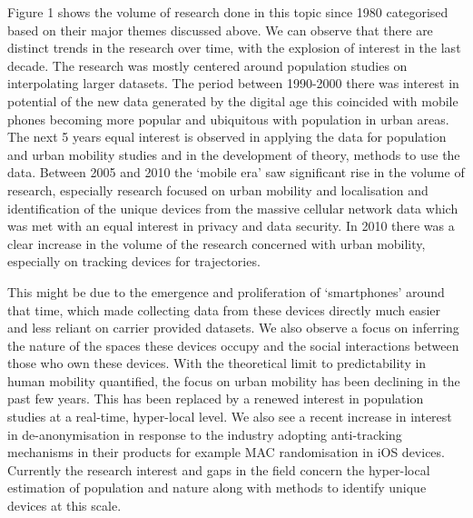Figure 1 shows the volume of research done in this topic since 1980 categorised based on their major themes discussed above.
We can observe that there are distinct trends in the research over time, with the explosion of interest in the last decade.
The research was mostly centered around population studies on interpolating larger datasets.
The period between 1990-2000 there was interest in potential of the new data generated by the digital age this coincided with mobile phones becoming more popular and ubiquitous with population in urban areas.
The next 5 years equal interest is observed in applying the data for population and urban mobility studies and in the development of theory, methods to use the data.
Between 2005 and 2010 the ‘mobile era’ saw significant rise in the volume of research, especially research focused on urban mobility and localisation and identification of the unique devices from the massive cellular network data which was met with an equal interest in privacy and data security.
In 2010 there was a clear increase in the volume of the research concerned with urban mobility, especially on tracking devices for trajectories.

This might be due to the emergence and proliferation of ‘smartphones’ around that time, which made collecting data from these devices directly much easier and less reliant on carrier provided datasets.
We also observe a focus on inferring the nature of the spaces these devices occupy and the social interactions between those who own these devices.
With the theoretical limit to predictability in human mobility quantified, the focus on urban mobility has been declining in the past few years.
This has been replaced by a renewed interest in population studies at a real-time, hyper-local level.
We also see a recent increase in interest in de-anonymisation in response to the industry adopting anti-tracking mechanisms in their products for example MAC randomisation in iOS devices.
Currently the research interest and gaps in the field concern the hyper-local estimation of population and nature along with methods to identify unique devices at this scale.
